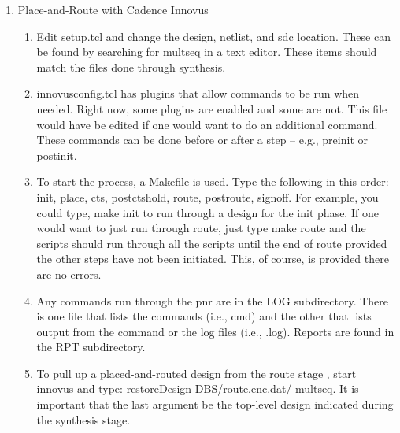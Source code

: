 \documentclass{article}
\begin{document}
\begin{enumerate}
\begin{itemize}
   \end{itemize}
   \item Place-and-Route with Cadence Innovus 
   \begin{enumerate}
       \item Edit setup.tcl and change the design, netlist, and sdc location. These can be found by searching for mult\textunderscore seq in a text editor. These items should match the files done through synthesis.
       \item innovus\textunderscore config.tcl has plugins that allow commands to be run when needed. Right now, some plugins are enabled and some are not. This file would have be edited if one would want to do an additional command. These commands can be done before or after a step -- e.g., pre\textunderscore init or post\textunderscore init. 
       \item To start the process, a Makefile is used. Type the following in this order: init, place, cts, postcts\textunderscore hold, route, postroute, signoff. For example, you could type, make init to run through a design for the init phase. If one would want to just run through route, just type make route and the scripts should run through all the scripts until the end of route provided the other steps have not been initiated. This, of course, is provided there are no errors. 
       \item Any commands run through the pnr are in the LOG subdirectory. There is one file that lists the commands (i.e., cmd) and the other that lists output from the command or the log files (i.e., .log). Reports are found in the RPT subdirectory. 
       \item To pull up a placed-and-routed design from the route stage , start innovus and type: restoreDesign DBS/route.enc.dat/ mult\textunderscore seq. It is important that the last argument be the top-level design indicated during the synthesis stage. 
   \end{enumerate}
\end{enumerate}
\end{document}
